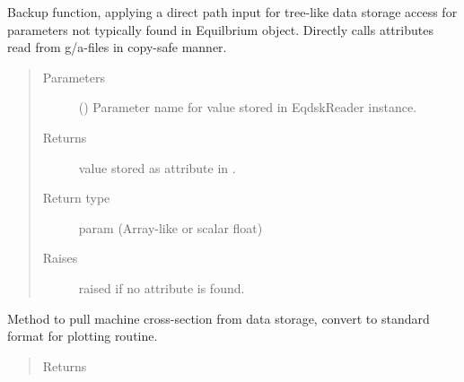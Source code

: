 \documentclass[letterpaper,10pt,english]{sphinxmanual}
\begin{document}
\begin{fulllineitems}
\begin{fulllineitems}
\end{fulllineitems}


\begin{fulllineitems}
\label{\detokenize{eqtools:eqtools.eqdskreader.EqdskReader.getParam}}
Backup function, applying a direct path input for tree-like data
storage access for parameters not typically found in Equilbrium object.
Directly calls attributes read from g/a-files in copy-safe manner.
\begin{quote}\begin{description}
\item[{Parameters}] \leavevmode
{} () \textendash{} Parameter name for value stored in EqdskReader
instance.

\item[{Returns}] \leavevmode
value stored as attribute in
{\hyperref[\detokenize{eqtools:eqtools.eqdskreader.EqdskReader}]{}}.

\item[{Return type}] \leavevmode
param (Array-like or scalar float)

\item[{Raises}] \leavevmode
{} \textendash{} raised if no attribute is found.

\end{description}\end{quote}

\end{fulllineitems}


\begin{fulllineitems}
\label{\detokenize{eqtools:eqtools.eqdskreader.EqdskReader.getMachineCrossSection}}
Method to pull machine cross-section from data storage, convert to
standard format for plotting routine.
\begin{quote}\begin{description}
\item[{Returns}] \leavevmode


\end{description}
\end{quote}
\end{fulllineitems}
\end{fulllineitems}
\end{document}
